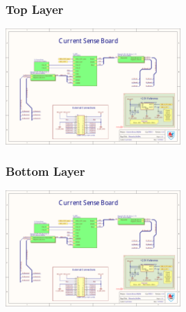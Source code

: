 \subsubsection{Top Layer}
\begin{center}
	\includegraphics[page=6,width=0.5\textwidth,angle=90,origin=c]{./Appendix/Job2.pdf}
\end{center}
\subsubsection{Bottom Layer}
\begin{center}
	\includegraphics[page=7,width=0.5\textwidth,angle=90,origin=c]{./Appendix/Job2.pdf}
\end{center}